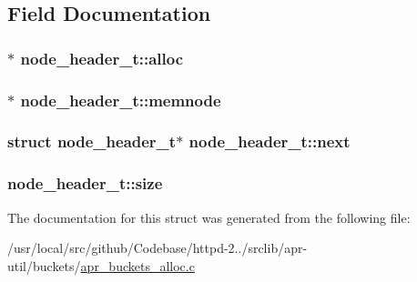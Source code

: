 \subsection{Field Documentation}
\subsubsection[{\texorpdfstring{alloc}{alloc}}]{$\ast$ node\+\_\+header\+\_\+t\+::alloc}\hypertarget{structnode__header__t_aecdddf457878b6b7780ced82c161c676}{}\label{structnode__header__t_aecdddf457878b6b7780ced82c161c676}
\subsubsection[{\texorpdfstring{memnode}{memnode}}]{$\ast$ node\+\_\+header\+\_\+t\+::memnode}\hypertarget{structnode__header__t_ac2e9fc463b234297da84034b02a08209}{}\label{structnode__header__t_ac2e9fc463b234297da84034b02a08209}
\subsubsection[{\texorpdfstring{next}{next}}]{\setlength{\rightskip}{0pt plus 5cm}struct {\bf node\+\_\+header\+\_\+t}$\ast$ node\+\_\+header\+\_\+t\+::next}\hypertarget{structnode__header__t_a2995afb43a348936ed006281fd395d04}{}\label{structnode__header__t_a2995afb43a348936ed006281fd395d04}
\subsubsection[{\texorpdfstring{size}{size}}]{ node\+\_\+header\+\_\+t\+::size}\hypertarget{structnode__header__t_a9406a1f564650e30801ed484fb531486}{}\label{structnode__header__t_a9406a1f564650e30801ed484fb531486}


The documentation for this struct was generated from the following file\+:\begin{DoxyCompactItemize}
\item 
/usr/local/src/github/\+Codebase/httpd-\/2../srclib/apr-\/util/buckets/\hyperlink{apr__buckets__alloc_8c}{apr\+\_\+buckets\+\_\+alloc.\+c}\end{DoxyCompactItemize}
